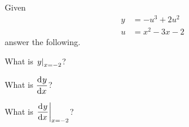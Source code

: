 Given
\begin{equation*}
 \begin{split}
   y &= -u^3 + 2 u^2
   \\
   u &= x^2 - 3x - 2
 \end{split}
\end{equation*}
answer the following.
\bigskip

\begin{ProblemSet}[pencil space=2in]

 \begin{Problem}[pencil space=1in]
  What is $\displaystyle{\left.y\right|_{x=-2}}$?
 \end{Problem}

 \begin{Problem}
  What is $\displaystyle{\frac{\mathrm{d}^{{}}y}{\mathrm{d}x^{{}}}}$?
 \end{Problem}

 \begin{Problem}
  What is $\displaystyle{\left.\frac{\mathrm{d}^{{}}y}{\mathrm{d}x^{{}}}\right|_{x=-2}}$?
 \end{Problem}

\end{ProblemSet}

